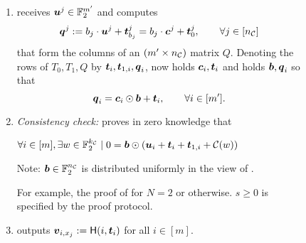 \begin{figure}[t!]
{\begin{minipage}{0.95\linewidth}
\begin{enumerate}
				\item\label{step:extCompQ} \send receives $\boldsymbol{u}^j\in\mathbb{F}^{m'}_2$ and computes
				$$
				\boldsymbol{q}^j := b_j \cdot \boldsymbol{u}^j +\boldsymbol{t}^j_{b_j} = b_j\cdot \boldsymbol{c}^j+\boldsymbol{t}^j_0,\qquad \forall j\in[{n_\mathcal{C}}]
				$$
				that form the columns of an $(m'\times {n_\mathcal{C}})$ matrix $Q$. Denoting the rows of $T_0,T_1, Q$ by $\boldsymbol{t}_i, \boldsymbol{t}_{1,i},\boldsymbol{q}_i$, \rec now holds $\boldsymbol{c}_i,\boldsymbol{t}_i$ and \send holds $\boldsymbol{b}, \boldsymbol{q}_i$ so that 
				$$
				\boldsymbol{q}_i = \boldsymbol{c}_i\odot \boldsymbol{b}+\boldsymbol{t}_i,\qquad \forall i\in[m'].
				$$
				
				\item \emph{Consistency check:}\label{step:consistency} \rec  proves in zero knowledge that %
				\begin{center}
					$	\forall i\in[m], \exists w\in\mathbb{F}^{{k_\mathcal{C}}}_2 \mid  0=\boldsymbol{b}\odot (\boldsymbol{u}_i+\boldsymbol{t}_i+\boldsymbol{t}_{1,i} +\mathcal{C}(w))$
				\end{center}
				Note: $\boldsymbol{b}\in\mathbb{F}^{{n_\mathcal{C}}}_2$ is distributed uniformly in the view of \rec.
				
				 For example, the proof of \cite{C:KelOrsSch15} for $N=2$ or \cite{RSA:OrrOrsSch17} otherwise. $s\geq0$ is specified by the proof protocol.
%					
%					
				\item \rec outputs $\boldsymbol{v}_{i, x_j}:=\mathsf{H}(i,\boldsymbol{t}_i)$ for all $i\in[m]$.
			\end{enumerate}
			

\end{minipage}}
\end{figure}
